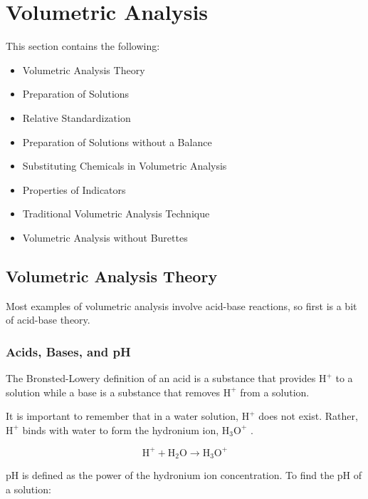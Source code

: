 
\section{Volumetric Analysis}

This section contains the following:
\begin{itemize}
\item Volumetric Analysis Theory
\item Preparation of Solutions
\item Relative Standardization
\item Preparation of Solutions without a Balance
\item Substituting Chemicals in Volumetric Analysis
\item Properties of Indicators
\item Traditional Volumetric Analysis Technique
\item Volumetric Analysis without Burettes
\end{itemize}

\subsection{Volumetric Analysis Theory}

Most examples of volumetric analysis involve acid-base reactions, so first is a bit of acid-base theory.

\subsubsection{Acids, Bases, and pH}

The Bronsted-Lowery definition of an acid is a substance that provides $\mathrm{H}^{+}$ to a solution while a base is a substance that removes $\mathrm{H}^{+}$ from a solution.

It is important to remember that in a water solution, $\mathrm{H}^{+}$ does not exist. Rather, $\mathrm{H}^{+}$ binds with water to form the hydronium ion, $ \mathrm{H}_3 \mathrm{O}^{+} $ .

\[ \mathrm{H}^{+} + \mathrm{H}_2 \mathrm{O} \longrightarrow \mathrm{H}_3 \mathrm{O}^{+} \]

pH is defined as the power of the hydronium ion concentration. To find the pH of a solution:

